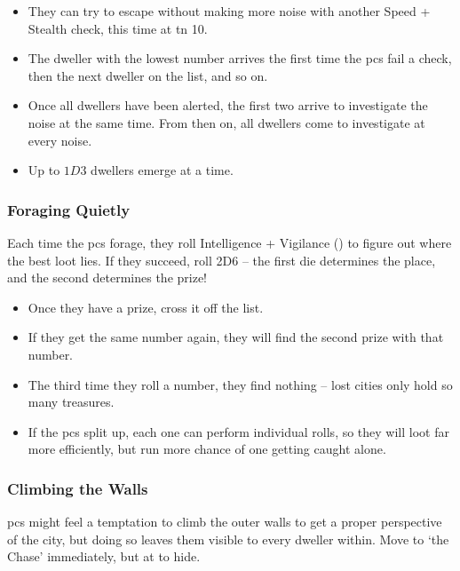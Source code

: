 \begin{multicols}{2}
\begin{itemize}
  \item
  They can try to escape without making more noise with another Speed + Stealth check, this time at \gls{tn} 10.
  \item
  The dweller with the lowest number arrives the first time the \glspl{pc} fail a check, then the next dweller on the list, and so on.
  \item
  Once all dwellers have been alerted, the first two arrive to investigate the noise at the same time.
  From then on, all dwellers come to investigate at every noise.
  \item
  Up to $1D3$ dwellers emerge at a time.
\end{itemize}

\subsubsection{Foraging Quietly}
\label{lostForaging}

Each time the \glspl{pc} forage, they roll Intelligence + Vigilance () to figure out where the best loot lies.
If they succeed, roll 2D6 -- the first die determines the place, and the second determines the prize!

\begin{itemize}
  \item
  Once they have a prize, cross it off the list.
  \item
  If they get the same number again, they will find the second prize with that number.
  \item
  The third time they roll a number, they find nothing -- lost cities only hold so many treasures.
  \item
  If the \glspl{pc} split up, each one can perform individual rolls, so they will loot far more efficiently, but run more chance of one getting caught alone.

\end{itemize}

\subsubsection{Climbing the Walls}

\Glspl{pc} might feel a temptation to climb the outer walls to get a proper perspective of the city, but doing so leaves them visible to every dweller within.
Move to `the Chase' immediately, but at  to hide.

\end{multicols}

\needspace{12em}
\bigLine

\begin{multicols}{2}

\jelly

\jelly

\jelly

\griffin

\chitincrawler

\demilich

\dragon

\end{multicols}

